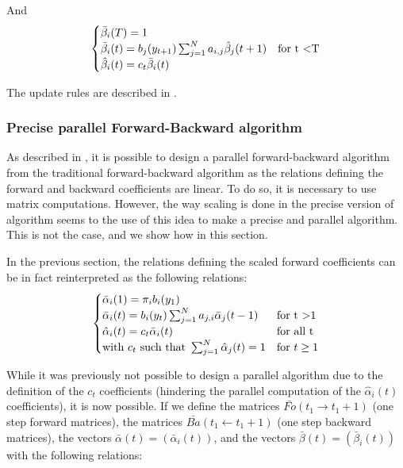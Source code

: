 And
\begin{equation}
\begin{cases}
\bar{\beta}_i(T) = 1 & \\
\bar{\beta}_i(t) = b_j(y_{t+1})\sum_{j=1}^{N}{a_{i,j}\hat{\beta}_j(t+1)} & \text{for t \textless T} \\
\hat{\beta}_i(t) = c_t \bar{\beta}_i(t)
\end{cases}
\end{equation}

The update rules are described in \cite{rabiner1989tutorial}.

\subsubsection*{Precise parallel Forward-Backward algorithm}
As described in \cite{turin1998unidirectional}, it is possible to design a parallel forward-backward algorithm from the traditional forward-backward algorithm as the relations defining the forward and backward coefficients are linear. To do so, it is necessary to use matrix computations. However, the way scaling is done in the precise version of algorithm seems to the use of this idea to make a precise and parallel algorithm. This is not the case, and we show how in this section.

In the previous section, the relations defining the scaled forward coefficients can be in fact reinterpreted as the following relations:
\begin{equation}
\begin{cases}
\bar{\alpha}_i(1) = \pi_i b_i(y_1) & \\
\bar{\alpha}_i(t) = b_i(y_t)\sum_{j=1}^{N}{a_{j,i}\bar{\alpha}_j(t-1)} & \text{for t \textgreater 1} \\
\hat{\alpha}_i(t) = c_t \bar{\alpha}_i(t) & \text{for all t} \\
\text{with } c_t \text{ such that } \sum_{j=1}^{N}{\hat{\alpha}_j(t)} = 1 & \text{for }t \ge 1
\end{cases}
\end{equation}

While it was previously not possible to design a parallel algorithm due to the definition of the $c_t$ coefficients (hindering the parallel computation of the $\hat{\alpha}_i(t)$ coefficients), it is now possible.
If we define the matrices $\bar{Fo}(t_1 \rightarrow t_1 + 1)$ (one step forward matrices), the matrices $\bar{Ba}( t_1 \leftarrow t_1 + 1)$ (one step backward matrices), the vectors $\bar{\alpha}(t)=(\bar{\alpha}_i(t))$, and the vectors $\bar{\beta}(t)=(\bar{\beta}_i(t))$ with the following relations:

